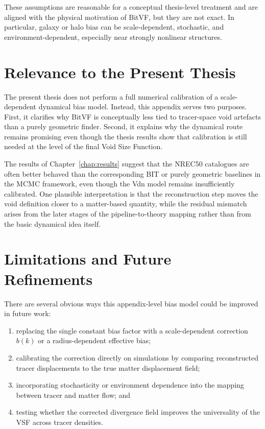 \documentclass[12pt]{report}
\begin{document}
These assumptions are reasonable for a conceptual thesis-level treatment and are aligned with the physical motivation of BitVF, but they are not exact. In particular, galaxy or halo bias can be scale-dependent, stochastic, and environment-dependent, especially near strongly nonlinear structures.

\section{Relevance to the Present Thesis}

The present thesis does not perform a full numerical calibration of a scale-dependent dynamical bias model. Instead, this appendix serves two purposes. First, it clarifies why BitVF is conceptually less tied to tracer-space void artefacts than a purely geometric finder. Second, it explains why the dynamical route remains promising even though the thesis results show that calibration is still needed at the level of the final Void Size Function.

The results of Chapter~\ref{chap:results} suggest that the NREC50 catalogues are often better behaved than the corresponding BIT or purely geometric baselines in the MCMC framework, even though the Vdn model remains insufficiently calibrated. One plausible interpretation is that the reconstruction step moves the void definition closer to a matter-based quantity, while the residual mismatch arises from the later stages of the pipeline-to-theory mapping rather than from the basic dynamical idea itself.

\section{Limitations and Future Refinements}

There are several obvious ways this appendix-level bias model could be improved in future work:
\begin{enumerate}
    \item replacing the single constant bias factor with a scale-dependent correction $b(k)$ or a radius-dependent effective bias;
    \item calibrating the correction directly on simulations by comparing reconstructed tracer displacements to the true matter displacement field;
    \item incorporating stochasticity or environment dependence into the mapping between tracer and matter flow; and
    \item testing whether the corrected divergence field improves the universality of the VSF across tracer densities.
\end{enumerate}
\end{document}
